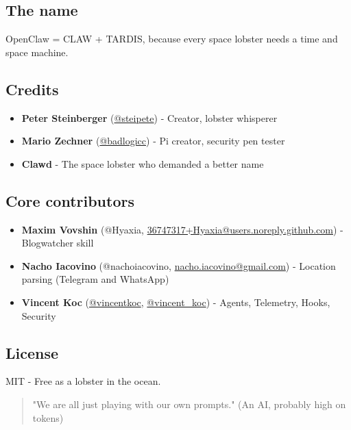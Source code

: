 \subsection{The name}


OpenClaw = CLAW + TARDIS, because every space lobster needs a time and space machine.

\subsection{Credits}


\begin{itemize}
  \item \textbf{Peter Steinberger} (\href{https://x.com/steipete}{@steipete}) - Creator, lobster whisperer
  \item \textbf{Mario Zechner} (\href{https://x.com/badlogicgames}{@badlogicc}) - Pi creator, security pen tester
  \item \textbf{Clawd} - The space lobster who demanded a better name
\end{itemize}


\subsection{Core contributors}


\begin{itemize}
  \item \textbf{Maxim Vovshin} (@Hyaxia, \href{mailto:36747317+Hyaxia@users.noreply.github.com}{36747317+Hyaxia@users.noreply.github.com}) - Blogwatcher skill
  \item \textbf{Nacho Iacovino} (@nachoiacovino, \href{mailto:nacho.iacovino@gmail.com}{nacho.iacovino@gmail.com}) - Location parsing (Telegram and WhatsApp)
  \item \textbf{Vincent Koc} (\href{https://github.com/vincentkoc}{@vincentkoc}, \href{https://x.com/vincent\_koc}{@vincent\_koc}) - Agents, Telemetry, Hooks, Security
\end{itemize}


\subsection{License}


MIT - Free as a lobster in the ocean.

\begin{quote}
"We are all just playing with our own prompts." (An AI, probably high on tokens)
\end{quote}



